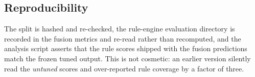 \subsection{Reproducibility}
\label{sec:repro}

The split is hashed and re-checked, the rule-engine evaluation directory is recorded in
the fusion metrics and re-read rather than recomputed, and the analysis script asserts
that the rule scores shipped with the fusion predictions match the frozen tuned output.
This is not cosmetic: an earlier version silently read the \emph{untuned} scores and
over-reported rule coverage by a factor of three.
